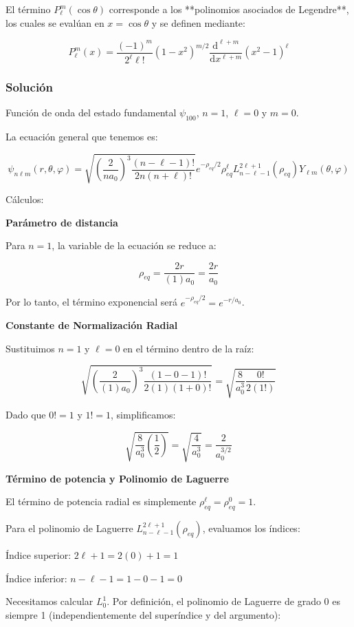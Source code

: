 \documentclass[a4paper]{article}
\begin{document}
El término $P_\ell^m(\cos\theta)$ corresponde a los **polinomios asociados de Legendre**, los cuales se evalúan en $x = \cos\theta$ y se definen mediante:

$$P_\ell^m(x) = \frac{(-1)^m}{2^\ell \ell!} (1-x^2)^{m/2} \frac{\mathrm{d}^{\ell+m}}{\mathrm{d}x^{\ell+m}} (x^2-1)^\ell$$

\subsubsection{Solución}

Función de onda del estado fundamental $\psi_{100}$, $n=1$, $\ell=0$ y $m=0$.

La ecuación general que tenemos es:

$$\psi_{n\ell m}(r, \theta, \varphi) = \sqrt{ \left( \frac{2}{na_0} \right)^3 \frac{(n-\ell-1)!}{2n(n+\ell)!} } e^{-\rho_{eq}/2} \rho_{eq}^\ell L_{n-\ell-1}^{2\ell+1}(\rho_{eq}) Y_{\ell m}(\theta, \varphi)$$

Cálculos:

\textbf{Parámetro de distancia}

Para $n=1$, la variable de la ecuación se reduce a:

$$\rho_{eq} = \frac{2r}{(1)a_0} = \frac{2r}{a_0}$$

Por lo tanto, el término exponencial será $e^{-\rho_{eq}/2} = e^{-r/a_0}$.

\textbf{Constante de Normalización Radial}

Sustituimos $n=1$ y $\ell=0$ en el término dentro de la raíz:

$$\sqrt{ \left( \frac{2}{(1)a_0} \right)^3 \frac{(1-0-1)!}{2(1)(1+0)!} } = \sqrt{ \frac{8}{a_0^3} \frac{0!}{2(1!)} }$$

Dado que $0! = 1$ y $1! = 1$, simplificamos:

$$\sqrt{ \frac{8}{a_0^3} \left(\frac{1}{2}\right) } = \sqrt{ \frac{4}{a_0^3} } = \frac{2}{a_0^{3/2}}$$

\textbf{Término de potencia y Polinomio de Laguerre}

El término de potencia radial es simplemente $\rho_{eq}^\ell = \rho_{eq}^0 = 1$.

Para el polinomio de Laguerre $L_{n-\ell-1}^{2\ell+1}(\rho_{eq})$, evaluamos los índices:

Índice superior: $2\ell+1 = 2(0)+1 = 1$

Índice inferior: $n-\ell-1 = 1-0-1 = 0$

Necesitamos calcular $L_0^1$. Por definición, el polinomio de Laguerre de grado 0 es siempre 1 (independientemente del superíndice y del argumento):
\end{document}
